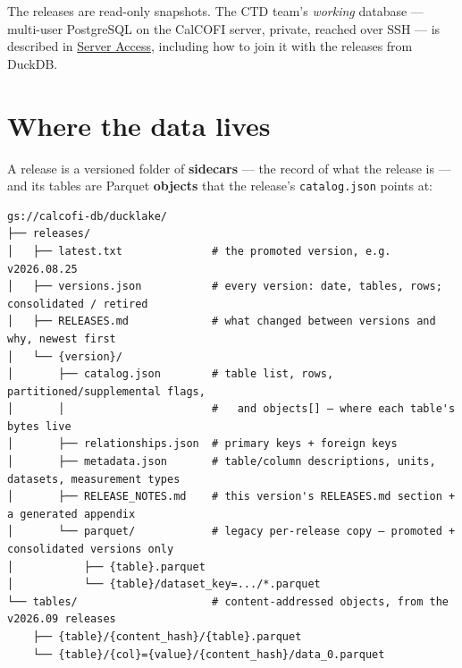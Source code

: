\documentclass[
  letterpaper,
  DIV=11,
  numbers=noendperiod]{scrreprt}
\begin{document}
The releases are read-only snapshots. The CTD team's \emph{working}
database --- multi-user PostgreSQL on the CalCOFI server, private,
reached over SSH --- is described in \href{server-access.qmd}{Server
Access}, including how to join it with the releases from DuckDB.

\section{Where the data lives}\label{where-the-data-lives}

A release is a versioned folder of \textbf{sidecars} --- the record of
what the release is --- and its tables are Parquet \textbf{objects} that
the release's \texttt{catalog.json} points at:

\begin{verbatim}
gs://calcofi-db/ducklake/
├── releases/
│   ├── latest.txt              # the promoted version, e.g. v2026.08.25
│   ├── versions.json           # every version: date, tables, rows; consolidated / retired
│   ├── RELEASES.md             # what changed between versions and why, newest first
│   └── {version}/
│       ├── catalog.json        # table list, rows, partitioned/supplemental flags,
│       │                       #   and objects[] — where each table's bytes live
│       ├── relationships.json  # primary keys + foreign keys
│       ├── metadata.json       # table/column descriptions, units, datasets, measurement types
│       ├── RELEASE_NOTES.md    # this version's RELEASES.md section + a generated appendix
│       └── parquet/            # legacy per-release copy — promoted + consolidated versions only
│           ├── {table}.parquet
│           └── {table}/dataset_key=.../*.parquet
└── tables/                     # content-addressed objects, from the v2026.09 releases
    ├── {table}/{content_hash}/{table}.parquet
    └── {table}/{col}={value}/{content_hash}/data_0.parquet
\end{verbatim}
\end{document}
